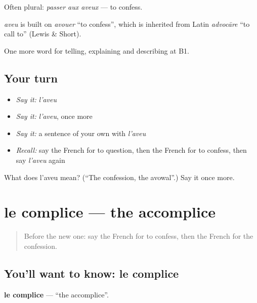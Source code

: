 Often plural: \emph{passer aux aveux} — to confess.

\begin{cousinweb}
\emph{aveu} is built on \emph{avouer} \textquotedblleft{}to confess\textquotedblright{}, which is inherited from Latin \emph{advocāre} \textquotedblleft{}to call to\textquotedblright{} (Lewis \& Short).
\end{cousinweb}

\begin{grammarlens}[title={What you've built}]
One more word for telling, explaining and describing at B1.
\end{grammarlens}

\subsection*{Your turn}
\begin{itemize}
\raggedright
  \item \emph{Say it:} \emph{l'aveu}
  \item \emph{Say it:} \emph{l'aveu}, once more
  \item \emph{Say it:} a sentence of your own with \emph{l'aveu}
  \item \emph{Recall:} say the French for to question, then the French for to confess, then say \emph{l'aveu} again
\end{itemize}

\begin{tcolorbox}[breakable,colback=teal!4,colframe=teal!35!black,title={Before you move on}]
What does l'aveu mean? (\textquotedblleft{}The confession, the avowal\textquotedblright{}.) Say it once more.
\end{tcolorbox}
\section[le complice]{le complice — the accomplice}

\label{lesson:FR-C295-complice}



\begin{quote}
Before the new one: say the French for to confess, then the French for the confession.
\end{quote}

\subsection*{You'll want to know: le complice}
\textbf{le complice} — \textquotedblleft{}the accomplice\textquotedblright{}.

